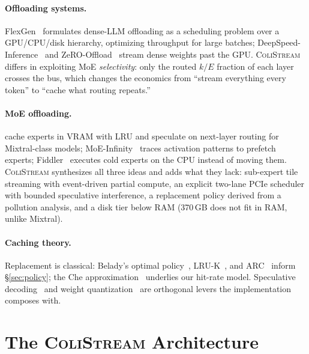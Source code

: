 \documentclass[11pt]{article}
\theoremstyle{definition}
\theoremstyle{remark}
\newcommand{\colistream}{\textsc{ColiStream}}
\begin{document}
\paragraph{Offloading systems.} FlexGen~\citep{sheng2023flexgen} formulates
dense-LLM offloading as a scheduling problem over a GPU/CPU/disk hierarchy,
optimizing throughput for large batches;
DeepSpeed-Inference~\citep{aminabadi2022deepspeed} and
ZeRO-Offload~\citep{ren2021zerooffload} stream dense weights past the GPU.
\colistream{} differs in exploiting MoE \emph{selectivity}: only the routed
$k/E$ fraction of each layer crosses the bus, which changes the economics
from ``stream everything every token'' to ``cache what routing repeats.''

\paragraph{MoE offloading.} \citet{eliseev2023fast} cache experts in VRAM
with LRU and speculate on next-layer routing for Mixtral-class models;
MoE-Infinity~\citep{xue2024moeinfinity} traces activation patterns to
prefetch experts; Fiddler~\citep{kamahori2024fiddler} executes cold experts
on the CPU instead of moving them. \colistream{} synthesizes all three ideas
and adds what they lack: sub-expert tile streaming with event-driven partial
compute, an explicit two-lane PCIe scheduler with bounded speculative
interference, a replacement policy derived from a pollution analysis, and a
disk tier below RAM (370\,GB does not fit in RAM, unlike Mixtral).

\paragraph{Caching theory.} Replacement is classical: Belady's optimal
policy~\citep{belady1966study}, LRU-K~\citep{oneil1993lruk}, and
ARC~\citep{megiddo2003arc} inform \S\ref{sec:policy}; the Che
approximation~\citep{che2002hierarchical} underlies our hit-rate model.
Speculative decoding~\citep{leviathan2023fast} and weight
quantization~\citep{frantar2022gptq,dettmers2022llmint8} are orthogonal
levers the implementation composes with.

\section{The \colistream{} Architecture}\label{sec:arch}
\end{document}
